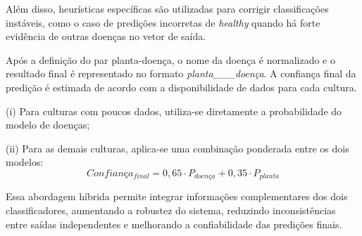 \documentclass[portuguese]{sbc2025}%
\begin{document}
Além disso, heurísticas específicas são utilizadas para corrigir classificações instáveis, como o caso de predições incorretas 
de \textit{healthy} quando há forte evidência de outras doenças no vetor de saída.

Após a definição do par planta-doença, o nome da doença é normalizado e o resultado final é representado no formato
\textit{planta\_\_\_doença}. A confiança final da predição é estimada de acordo com a disponibilidade de dados para cada cultura.

(i) Para culturas com poucos dados, utiliza-se diretamente a probabilidade do modelo de doenças;

(ii) Para as demais culturas, aplica-se uma combinação ponderada entre os dois modelos:
\begin{equation} Confiança_{final} = 0{,}65 \cdot P_{doença} + 0{,}35 \cdot P_{planta} \end{equation}

Essa abordagem híbrida permite integrar informações complementares dos dois classificadores, aumentando a robustez do sistema,
reduzindo inconsistências entre saídas independentes e melhorando a confiabilidade das predições finais.
\end{document}
